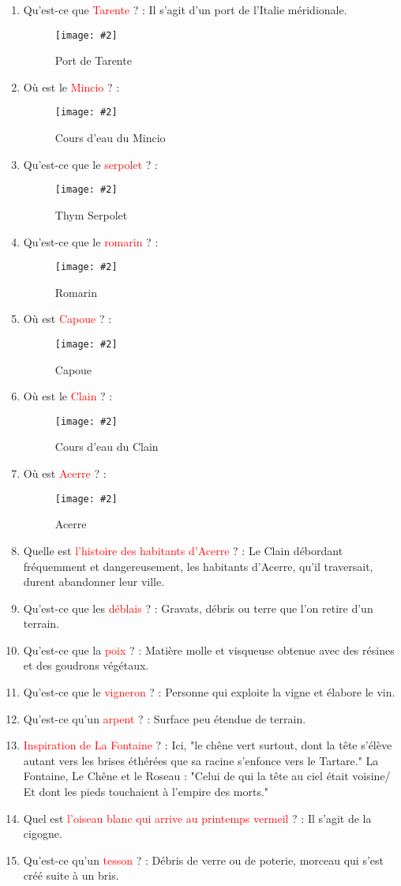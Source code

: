 \documentclass[a4paper, 11pt, hidelinks]{article}
\newcommand{\img}[4]{\begin{figure}[!ht]
    \centering
    \texttt{[image: \#2]}
    \caption{#3}
    \label{#4}
    \end{figure} }
\begin{document}
\begin{enumerate}
            \item Qu'est-ce que \textcolor{red}{Tarente} ? : Il s'agit d'un port de l'Italie méridionale.
            \img{0.3}{Tarente.png}{Port de Tarente}{87}
            \item Où est le \textcolor{red}{Mincio} ? :
            \img{0.4}{Mincio.png}{Cours d'eau du Mincio}{88}
            \item Qu'est-ce que le \textcolor{red}{serpolet} ? :
            \img{0.5}{Serpolet.jpg}{Thym Serpolet}{89}
      \item Qu'est-ce que le \textcolor{red}{romarin} ? :
            \img{0.5}{Romarin.jpg}{Romarin}{90}
            \item Où est \textcolor{red}{Capoue} ? :
            \img{0.5}{Capoue.png}{Capoue}{91}
      \item Où est le \textcolor{red}{Clain} ? :
            \img{0.4}{Clain.png}{Cours d'eau du Clain}{92}
      \item Où est \textcolor{red}{Acerre} ? :
            \img{0.4}{Acerre.png}{Acerre}{93}
      \item Quelle est \textcolor{red}{l'histoire des habitants d'Acerre} ? : Le Clain débordant fréquemment et dangereusement, les habitants d'Acerre,
            qu'il traversait, durent abandonner leur ville.
            \item Qu'est-ce que les \textcolor{red}{déblais} ? : Gravats, débris ou terre que l'on retire d'un terrain.
            \item Qu'est-ce que la \textcolor{red}{poix} ? : Matière molle et visqueuse obtenue avec des résines et des goudrons végétaux.
            \item Qu'est-ce que le \textcolor{red}{vigneron} ? : Personne qui exploite la vigne et élabore le vin.
            \item Qu'est-ce qu'un \textcolor{red}{arpent} ? : Surface peu étendue de terrain.
            \item \textcolor{red}{Inspiration de La Fontaine} ? : Ici, "le chêne vert surtout, dont la tête s'élève autant vers les brises éthérées
            que sa racine s'enfonce vers le Tartare." La Fontaine, Le Chêne et le Roseau : "Celui de qui la tête au ciel était voisine/
            Et dont les pieds touchaient à l'empire des morts."
            \item Quel est \textcolor{red}{l'oiseau blanc qui arrive au printemps vermeil} ? : Il s'agit de la cigogne.
            \item Qu'est-ce qu'un \textcolor{red}{tesson} ? : Débris de verre ou de poterie, morceau qui s'est créé suite à un bris.

\end{enumerate}
\end{document}
